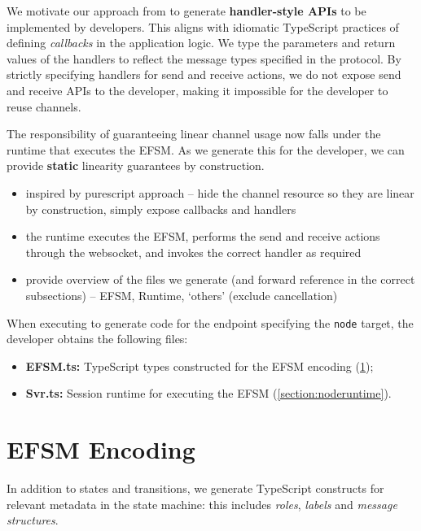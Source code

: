 We motivate our approach from \cite{PureScript2019, HuJava}
to generate \textbf{handler-style APIs} to be implemented
by developers.
This aligns with idiomatic TypeScript practices of defining
\textit{callbacks} in the application logic.
We type the parameters and return values of the handlers to
reflect the message types specified in the protocol.
By strictly specifying handlers for send and receive actions,
we do not expose send and receive APIs to the developer,
making it impossible for the developer to reuse channels.

The responsibility of guaranteeing linear channel usage now falls
under the runtime that executes the EFSM.
As we generate this for the developer,
we can provide \textbf{static}
linearity guarantees by construction.

\begin{itemize}

\item inspired by purescript approach -- hide the channel resource so they are linear by construction, simply expose callbacks and handlers
\item the runtime executes the EFSM, performs the send and receive actions through the websocket, and invokes the correct handler as required
\item provide overview of the files we generate (and forward reference in the correct subsections) -- EFSM, Runtime, `others' (exclude cancellation)
\end{itemize}

When executing  to generate code for the
 endpoint specifying the \texttt{node} target,
the developer obtains the following files:

\begin{itemize}
\item \textbf{EFSM.ts:} TypeScript types constructed for 
the EFSM encoding (\cref{section:nodeefsm});
\item \textbf{Svr.ts:} Session runtime for executing the EFSM 
(\cref{section:noderuntime}).
\end{itemize}

\section{EFSM Encoding}
\label{section:nodeefsm}

In addition to states and transitions, we generate 
TypeScript constructs
for relevant metadata in the state machine: this includes
\textit{roles}, \textit{labels} and \textit{message structures}.


